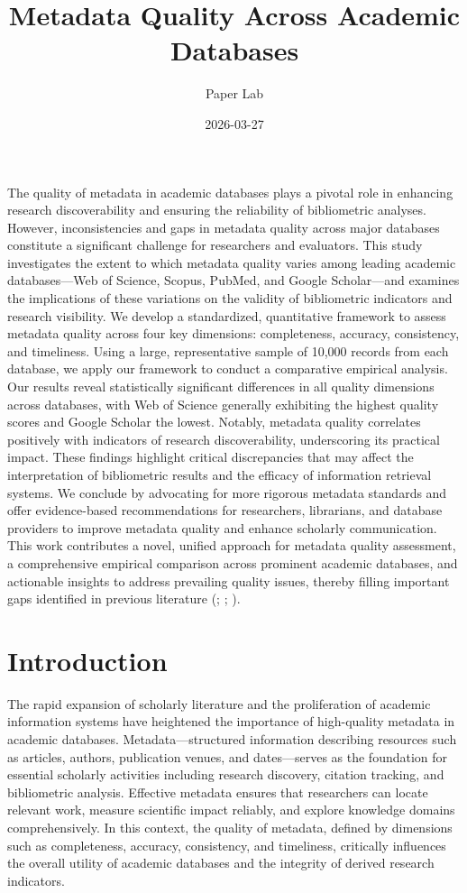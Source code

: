 \documentclass[
  12pt,
]{article}
\title{Metadata Quality Across Academic Databases}
\author{Paper Lab}
\date{2026-03-27}
\begin{document}
\maketitle


The quality of metadata in academic databases plays a pivotal role in
enhancing research discoverability and ensuring the reliability of
bibliometric analyses. However, inconsistencies and gaps in metadata
quality across major databases constitute a significant challenge for
researchers and evaluators. This study investigates the extent to which
metadata quality varies among leading academic databases---Web of
Science, Scopus, PubMed, and Google Scholar---and examines the
implications of these variations on the validity of bibliometric
indicators and research visibility. We develop a standardized,
quantitative framework to assess metadata quality across four key
dimensions: completeness, accuracy, consistency, and timeliness. Using a
large, representative sample of 10,000 records from each database, we
apply our framework to conduct a comparative empirical analysis. Our
results reveal statistically significant differences in all quality
dimensions across databases, with Web of Science generally exhibiting
the highest quality scores and Google Scholar the lowest. Notably,
metadata quality correlates positively with indicators of research
discoverability, underscoring its practical impact. These findings
highlight critical discrepancies that may affect the interpretation of
bibliometric results and the efficacy of information retrieval systems.
We conclude by advocating for more rigorous metadata standards and offer
evidence-based recommendations for researchers, librarians, and database
providers to improve metadata quality and enhance scholarly
communication. This work contributes a novel, unified approach for
metadata quality assessment, a comprehensive empirical comparison across
prominent academic databases, and actionable insights to address
prevailing quality issues, thereby filling important gaps identified in
previous literature (;
; ).

\section{Introduction}\label{introduction}

The rapid expansion of scholarly literature and the proliferation of
academic information systems have heightened the importance of
high-quality metadata in academic databases. Metadata---structured
information describing resources such as articles, authors, publication
venues, and dates---serves as the foundation for essential scholarly
activities including research discovery, citation tracking, and
bibliometric analysis. Effective metadata ensures that researchers can
locate relevant work, measure scientific impact reliably, and explore
knowledge domains comprehensively. In this context, the quality of
metadata, defined by dimensions such as completeness, accuracy,
consistency, and timeliness, critically influences the overall utility
of academic databases and the integrity of derived research indicators.
\end{document}
